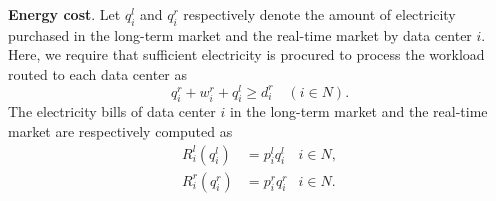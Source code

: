 

\textbf{Energy cost}. Let $q^l_i$ and ${q}_i^r$ respectively denote the amount of electricity purchased in the long-term market and the real-time market by data center $i.$ Here, we require that sufficient electricity is procured to process the workload routed to each data center as
$$q^r_i + w^r_i + q^l_i \geq d^r_i \quad (i \in N).$$
The electricity bills of data center $i$ in the long-term market and the real-time market are respectively computed as
\begin{align*}
	R^l_i(q^l_i) &= p^l_i q^l_i & i\in N, \\
	R^r_i(q^r_i) &= {p}_i^r q^r_i & i \in N.
\end{align*}



